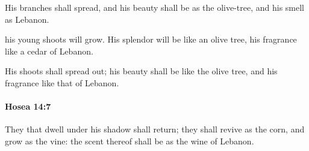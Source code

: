 			\begin{versebox}
					\item[BHS] 
					\item[LXX] 
					\item[ASV] His branches shall spread, and his beauty shall be as the olive-tree, and his smell as Lebanon.
					\item[NIV] his young shoots will grow. His splendor will be like an olive tree, his fragrance like a cedar of Lebanon.
					\item[NRSV] His shoots shall spread out; his beauty shall be like the olive tree, and his fragrance like that of Lebanon.
			\end{versebox}

		\paragraph{Hosea 14:7} %
			\label{HOSEA-14-7}

			They that dwell under his shadow shall return; they shall revive as the corn, and grow as the vine: the scent thereof shall be as the wine of Lebanon.

